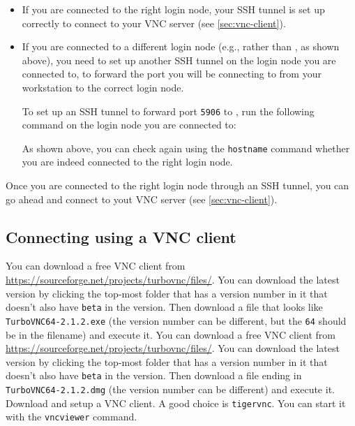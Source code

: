 \begin{itemize}

\item If you are connected to the right login node, your SSH tunnel is set up correctly to connect to your VNC server
      (see \autoref{sec:vnc-client}).

\item If you are connected to a different login node (e.g., \texttt{\altloginhost} rather than \texttt{\loginhost},
      as shown above), you need to set up another SSH tunnel on the login node you are connected to,
      to forward the port you will be connecting to from your workstation to the correct login node.

      To set up an SSH tunnel to forward port \lstinline|5906| to \texttt{\loginhost}, run the following command
      on the login node you are connected to:

\begin{prompt}
\end{prompt}


      As shown above, you can check again using the \lstinline|hostname| command whether you are indeed connected
      to the right login node.
\end{itemize}

Once you are connected to the right login node through an SSH tunnel, you can go ahead and connect to yout VNC server
(see \autoref{sec:vnc-client}).

\subsection{Connecting using a VNC client}
\label{sec:vnc-client}

\ifwindows

You can download a free VNC client from \url{https://sourceforge.net/projects/turbovnc/files/}.
You can download the latest version by clicking the top-most folder that has a version number
in it that doesn't also have \lstinline|beta| in the version. Then download a file that looks like
\lstinline|TurboVNC64-2.1.2.exe| (the version number can be different, but the \lstinline|64|
should be in the filename) and execute it.
\fi
\ifmac
You can download a free VNC client from \url{https://sourceforge.net/projects/turbovnc/files/}.
You can download the latest version by clicking the top-most folder that has a version number
in it that doesn't also have \lstinline|beta| in the version. Then download a file ending in
\lstinline|TurboVNC64-2.1.2.dmg| (the version number can be different) and execute it.
\fi
\iflinux
Download and setup a VNC client. A good choice is \lstinline|tigervnc|. You can start
it with the \lstinline|vncviewer| command.
\fi

